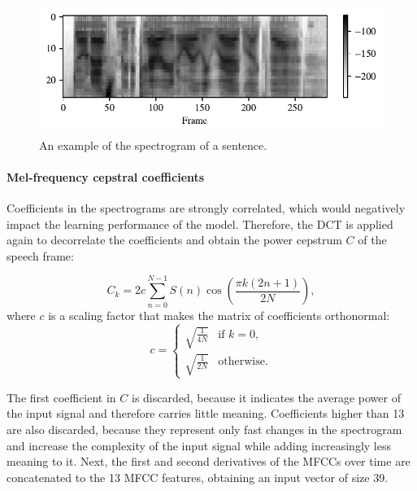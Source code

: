 			\begin{figure}[ht]
				\centering
			    \includegraphics[width=\linewidth]{gfx/spectrogram}
			    \caption[Spectrogram]{An example of the spectrogram of a sentence.}
			    \label{fig:spectrogram}
			\end{figure}

		\paragraph{Mel-frequency cepstral coefficients}

			Coefficients in the spectrograms are strongly correlated, which would negatively impact the learning performance of the model.
			Therefore, the DCT is applied again to decorrelate the coefficients and obtain the power cepstrum $C$ of the speech frame:

			\begin{equation}
				C_k = 2c\sum^{N-1}_{n=0}S\left(n\right)\cos\left(\frac{\pi k\left(2n+1\right)}{2N}\right),
			\end{equation}
			where $c$ is a scaling factor that makes the matrix of coefficients orthonormal:
			\begin{equation}
			c = \begin{cases}
				\sqrt{\frac{1}{4N}} & \mbox{if } k = 0,\\
				\sqrt{\frac{1}{2N}} & \mbox{otherwise.}
			\end{cases}
			\end{equation}

			The first coefficient in $C$ is discarded, because it indicates the average power of the input signal and therefore carries little meaning.
			Coefficients higher than 13 are also discarded, because they represent only fast changes in the spectrogram and increase the complexity of the input signal while adding increasingly less meaning to it.
			Next, the first and second derivatives of the MFCCs over time are concatenated to the 13 MFCC features, obtaining an input vector of size 39.

